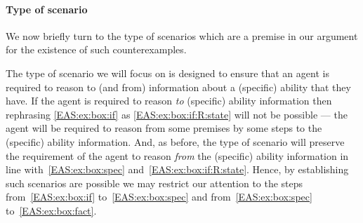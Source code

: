 \paragraph{Type of scenario}

\begin{note}
  We now briefly turn to the type of scenarios which are a premise in our argument for the existence of such counterexamples.
\end{note}

\begin{note}
  The type of scenario we will focus on is designed to ensure that an agent is required to reason to (and from) information about a (specific) ability that they have.
  If the agent is required to reason \emph{to} (specific) ability information then rephrasing \ref{EAS:ex:box:if} as \ref{EAS:ex:box:if:R:state} will not be possible --- the agent will be required to reason from some premises by some steps to the (specific) ability information.
  And, as before, the type of scenario will preserve the requirement of the agent to reason \emph{from} the (specific) ability information in line with~\ref{EAS:ex:box:spec} and~\ref{EAS:ex:box:if:R:state}.
  Hence, by establishing such scenarios are possible we may restrict our attention to the steps from~\ref{EAS:ex:box:if} to~\ref{EAS:ex:box:spec} and from~\ref{EAS:ex:box:spec} to~\ref{EAS:ex:box:fact}.
\end{note}

